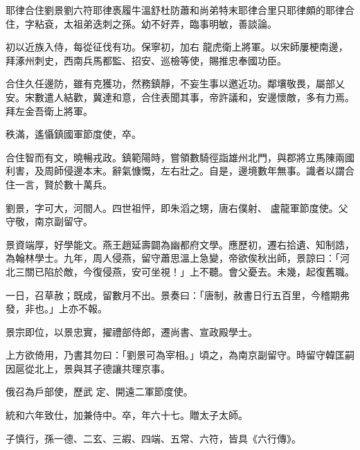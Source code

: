 
\begin{pinyinscope}

 耶律合住劉景劉六符耶律褭履牛溫舒杜防蕭和尚弟特末耶律合里只耶律頗的耶律合住，字粘袞，太祖弟迭刺之孫。幼不好弄，臨事明敏，善談論。



 初以近族入侍，每從征伐有功。保寧初，加右
 龍虎衛上將軍。以宋師屢梗南邊，拜涿州刺史，西南兵馬都監、招安、巡檢等使，賜推忠奉國功臣。



 合住久任邊防，雖有克獲功，然務鎮靜，不妄生事以邀近功。鄰壤敬畏，屬部乂安。宋數遣人結歡，冀達和意，合住表聞其事，帝許議和，安邊懷敵，多有力焉。拜左金吾衛上將軍。



 秩滿，遙懾鎮國軍節度使，卒。



 合住智而有文，曉暢戎政。鎮範陽時，嘗領數騎徑詣雄州北門，與郡將立馬陳兩國利害，及周師侵邊本末。辭氣慷慨，左右壯之。自是，邊境數年無事。識者以謂合住一言，賢於數十萬兵。



 劉景，字可大，河間人。四世祖怦，即朱滔之甥，唐右僕射、
 盧龍軍節度使。父守敬，南京副留守。



 景資端厚，好學能文。燕王趙延壽闢為幽都府文學。應歷初，遷右拾遺、知制誥，為翰林學士。九年，周人侵燕，留守蕭思溫上急變，帝欲俟秋出師，景諒曰：「河北三關已陷於敵，今復侵燕，安可坐視！」上不聽。會父憂去。未幾，起復舊職。



 一日，召草赦；既成，留數月不出。景奏曰：「唐制，赦書日行五百里，今稽期弗發，非也。」上亦不報。



 景宗即位，以景忠實，擢禮部侍郎，遷尚書、宣政殿學士。



 上方欲倚用，乃書其勿曰：「劉景可為宰相。」頃之，為南京副留守。時留守韓匡嗣因扈從北上，景與其子德讓共理京事。



 俄召為戶部使，歷武
 定、開遠二軍節度使。



 統和六年致仕，加兼侍中。卒，年六十七。贈太子太師。



 子慎行，孫一德、二玄、三嘏、四端、五常、六符，皆具《六行傳》。




\end{pinyinscope}
